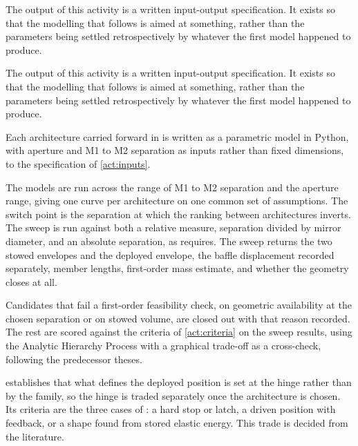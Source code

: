 The output of this activity is a written input-output specification. It exists so that the modelling that follows is aimed at something, rather than the parameters being settled retrospectively by whatever the first model happened to produce.

The output of this activity is a written input-output specification. It exists so that the modelling that follows is aimed at something, rather than the parameters being settled retrospectively by whatever the first model happened to produce.

 Each architecture carried forward in  is written as a parametric model in Python, with aperture and M1 to M2 separation as inputs rather than fixed dimensions, to the specification of \cref{act:inputs}.

 The models are run across the range of M1 to M2 separation and the aperture range, giving one curve per architecture on one common set of assumptions. The switch point is the separation at which the ranking between architectures inverts. The sweep is run against both a relative measure, separation divided by mirror diameter, and an absolute separation, as  requires. The sweep returns the two stowed envelopes and the deployed envelope, the baffle displacement recorded separately, member lengths, first-order mass estimate, and whether the geometry closes at all.

 Candidates that fail a first-order feasibility check, on geometric availability at the chosen separation or on stowed volume, are closed out with that reason recorded. The rest are scored against the criteria of \cref{act:criteria} on the sweep results, using the Analytic Hierarchy Process with a graphical trade-off as a cross-check, following the predecessor theses.

  establishes that what defines the deployed position is set at the hinge rather than by the family, so the hinge is traded separately once the architecture is chosen. Its criteria are the three cases of : a hard stop or latch, a driven position with feedback, or a shape found from stored elastic energy. This trade is decided from the literature.


